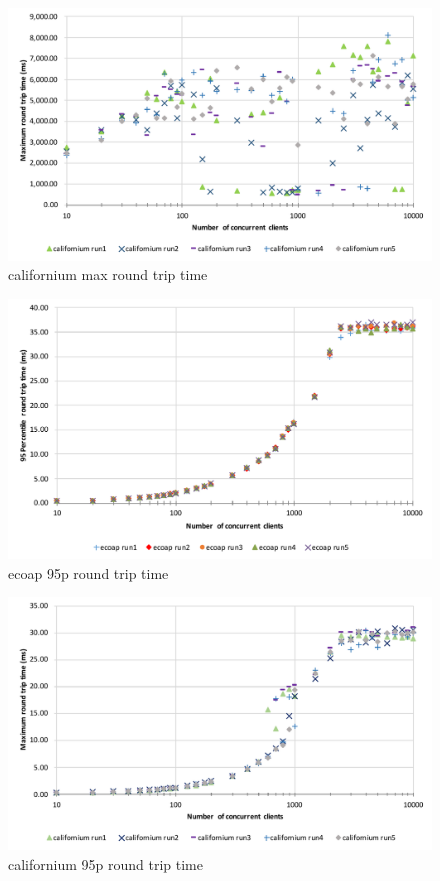 \begin{figure}[!htbp]
\centering
\includegraphics[scale = 0.8]{californium_max_round_trip_time}
\caption{californium max round trip time}
\label{fig:californium_max_round_trip_time}
\end{figure}

\begin{figure}[!htbp]
\centering
\includegraphics[scale = 0.8]{ecoap_95p_round_trip_time}
\caption{ecoap 95p round trip time}
\label{fig:ecoap_95p_round_trip_time}
\end{figure}

\begin{figure}[!htbp]
\centering
\includegraphics[scale = 0.8]{californium_95p_round_trip_time}
\caption{californium 95p round trip time}
\label{fig:californium_95p_round_trip_time}
\end{figure}

